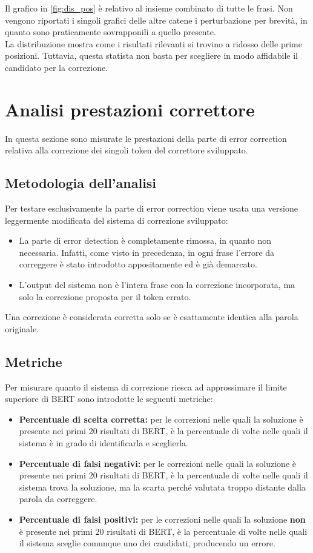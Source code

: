 \documentclass[12pt]{article}
\begin{document}
Il grafico in \autoref{fig:dis_pos} è relativo al insieme combinato di tutte le frasi. Non vengono riportati i singoli grafici delle altre catene i perturbazione per brevità, in quanto sono praticamente sovrapponili a quello presente.\\
La distribuzione mostra come i risultati rilevanti si trovino a ridosso delle prime posizioni. Tuttavia, questa statista non basta per scegliere in modo affidabile il candidato per la correzione.


\section{Analisi prestazioni correttore}
In questa sezione sono misurate le prestazioni della parte di error correction relativa alla correzione dei singoli token del correttore sviluppato.

\subsection{Metodologia dell'analisi}
Per testare esclusivamente la parte di error correction viene usata una versione leggermente modificata del sistema di correzione sviluppato:
\begin{itemize}
\item La parte di error detection è completamente rimossa, in quanto non necessaria. Infatti, come visto in precedenza, in ogni frase l'errore da correggere è stato introdotto appositamente ed è già demarcato.
\item L'output del sistema non è l'intera frase con la correzione incorporata, ma solo la correzione proposta per il token errato.
\end{itemize}

Una correzione è considerata corretta solo se è esattamente identica alla parola originale.

\subsection{Metriche}
Per misurare quanto il sistema di correzione riesca ad approssimare il limite superiore di BERT sono introdotte le seguenti metriche:
\begin{itemize}
\item \textbf{Percentuale di scelta corretta:} per le correzioni nelle quali la soluzione è presente nei primi 20 risultati di BERT, è la percentuale di volte nelle quali il sistema è in grado di identificarla e sceglierla.
\item \textbf{Percentuale di falsi negativi:} per le correzioni nelle quali la soluzione è presente nei primi 20 risultati di BERT, è la percentuale di volte nelle quali il sistema trova la soluzione, ma la scarta perché valutata troppo distante dalla parola da correggere.
\item \textbf{Percentuale di falsi positivi:} per le correzioni nelle quali la soluzione \textbf{non} è presente nei primi 20 risultati di BERT, è la percentuale di volte nelle quali il sistema sceglie comunque uno dei candidati, producendo un errore.
\end{itemize}
\end{document}
